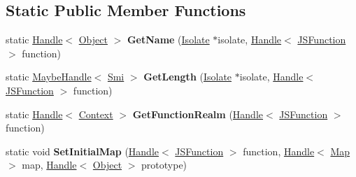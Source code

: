 \subsection*{Static Public Member Functions}
\begin{DoxyCompactItemize}
\item 
static \hyperlink{classv8_1_1internal_1_1_handle}{Handle}$<$ \hyperlink{classv8_1_1internal_1_1_object}{Object} $>$ {\bfseries Get\+Name} (\hyperlink{classv8_1_1internal_1_1_isolate}{Isolate} $\ast$isolate, \hyperlink{classv8_1_1internal_1_1_handle}{Handle}$<$ \hyperlink{classv8_1_1internal_1_1_j_s_function}{J\+S\+Function} $>$ function)\hypertarget{classv8_1_1internal_1_1_j_s_function_a88a67b0552607343a1fa19b81ae62d67}{}\label{classv8_1_1internal_1_1_j_s_function_a88a67b0552607343a1fa19b81ae62d67}

\item 
static \hyperlink{classv8_1_1internal_1_1_maybe_handle}{Maybe\+Handle}$<$ \hyperlink{classv8_1_1internal_1_1_smi}{Smi} $>$ {\bfseries Get\+Length} (\hyperlink{classv8_1_1internal_1_1_isolate}{Isolate} $\ast$isolate, \hyperlink{classv8_1_1internal_1_1_handle}{Handle}$<$ \hyperlink{classv8_1_1internal_1_1_j_s_function}{J\+S\+Function} $>$ function)\hypertarget{classv8_1_1internal_1_1_j_s_function_a6aacc6b5c6781a5970e6ca991522a9b8}{}\label{classv8_1_1internal_1_1_j_s_function_a6aacc6b5c6781a5970e6ca991522a9b8}

\item 
static \hyperlink{classv8_1_1internal_1_1_handle}{Handle}$<$ \hyperlink{classv8_1_1internal_1_1_context}{Context} $>$ {\bfseries Get\+Function\+Realm} (\hyperlink{classv8_1_1internal_1_1_handle}{Handle}$<$ \hyperlink{classv8_1_1internal_1_1_j_s_function}{J\+S\+Function} $>$ function)\hypertarget{classv8_1_1internal_1_1_j_s_function_a00978787d2a2af4763b32809cd5817db}{}\label{classv8_1_1internal_1_1_j_s_function_a00978787d2a2af4763b32809cd5817db}

\item 
static void {\bfseries Set\+Initial\+Map} (\hyperlink{classv8_1_1internal_1_1_handle}{Handle}$<$ \hyperlink{classv8_1_1internal_1_1_j_s_function}{J\+S\+Function} $>$ function, \hyperlink{classv8_1_1internal_1_1_handle}{Handle}$<$ \hyperlink{classv8_1_1internal_1_1_map}{Map} $>$ map, \hyperlink{classv8_1_1internal_1_1_handle}{Handle}$<$ \hyperlink{classv8_1_1internal_1_1_object}{Object} $>$ prototype)\hypertarget{classv8_1_1internal_1_1_j_s_function_a48718f059b10957861aaecf82963da22}{}\label{classv8_1_1internal_1_1_j_s_function_a48718f059b10957861aaecf82963da22}


\end{DoxyCompactItemize}
